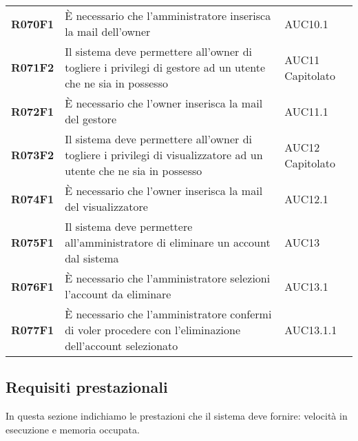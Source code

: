 \documentclass[../analisi-dei-requisiti.tex]{subfiles}
\begin{document}
\begin{longtable}[H]{>{\centering\bfseries}m{3cm} >{\centering}m{10cm} >{\centering\arraybackslash}m{3cm}}
  R070F1                  & È necessario che l'amministratore inserisca la mail dell'owner                                                                                                                     & AUC10.1                       \\
  R071F2                  & Il sistema deve permettere all'owner di togliere i privilegi di gestore ad un utente che ne sia in possesso                                                                        & AUC11 Capitolato              \\
  R072F1                  & È necessario che l'owner inserisca la mail del gestore                                                                                                                             & AUC11.1                       \\
  R073F2                  & Il sistema deve permettere all'owner di togliere i privilegi di visualizzatore ad un utente che ne sia in possesso                                                                 & AUC12 Capitolato              \\
  R074F1                  & È necessario che l'owner inserisca la mail del visualizzatore                                                                                                                      & AUC12.1                       \\
  R075F1                  & Il sistema deve permettere all'amministratore di eliminare un account dal sistema                                                                                                  & AUC13                         \\
  R076F1                  & È necessario che l'amministratore selezioni l'account da eliminare                                                                                                                 & AUC13.1                       \\
  R077F1                  & È necessario che l'amministratore confermi di voler procedere con l'eliminazione dell'account selezionato                                                                          & AUC13.1.1                     \\
\end{longtable}

\newpage
\subsection{Requisiti prestazionali}%
\label{sub:requisiti_prestazionali}
In questa sezione indichiamo le prestazioni che il sistema deve fornire: velocità in esecuzione e memoria occupata.
\end{document}
